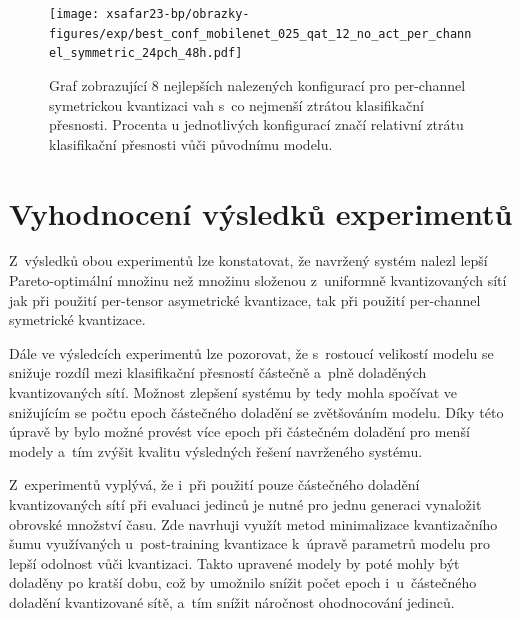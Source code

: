 \begin{figure}[H]
	\centering
	\texttt{[image: xsafar23-bp/obrazky-figures/exp/best\_conf\_mobilenet\_025\_qat\_12\_no\_act\_per\_channel\_symmetric\_24pch\_48h.pdf]}
    \caption{Graf zobrazující 8 nejlepších nalezených konfigurací pro per-channel symetrickou kvantizaci vah s~co nejmenší ztrátou klasifikační přesnosti. Procenta u jednotlivých konfigurací značí relativní ztrátu klasifikační přesnosti vůči původnímu modelu.}
	\label{fig:best_confs_per_channel}
\end{figure}

\section{Vyhodnocení výsledků experimentů}
\label{section:results_and_discussion}

Z~výsledků obou experimentů lze konstatovat, že navržený systém nalezl lepší Pareto-optimální množinu než množinu složenou z~uniformně kvantizovaných sítí jak při použití per-tensor asymetrické kvantizace, tak při použití per-channel symetrické kvantizace. 

Dále ve výsledcích experimentů lze pozorovat, že s~rostoucí velikostí modelu se snižuje rozdíl mezi klasifikační přesností částečně a~plně doladěných kvantizovaných sítí. Možnost zlepšení systému by tedy mohla spočívat ve snižujícím se počtu epoch částečného doladění se zvětšováním modelu. Díky této úpravě by bylo možné provést více epoch při částečném doladění pro menší modely a~tím zvýšit kvalitu výsledných řešení navrženého systému.

Z~experimentů vyplývá, že i~při použití pouze částečného doladění kvantizovaných sítí při evaluaci jedinců je nutné pro jednu generaci vynaložit obrovské množství času. Zde navrhuji využít metod minimalizace kvantizačního šumu využívaných u~post-training kvantizace k~úpravě parametrů modelu pro lepší odolnost vůči kvantizaci. Takto upravené modely by poté mohly být doladěny po kratší dobu, což by umožnilo snížit počet epoch i~u~částečného doladění kvantizované sítě, a~tím snížit náročnost ohodnocování jedinců.


